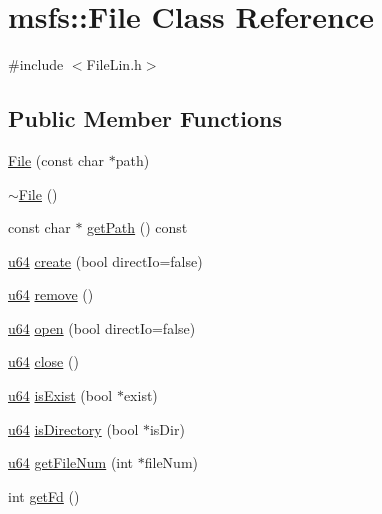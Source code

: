 \hypertarget{classmsfs_1_1_file}{}\section{msfs\+:\+:File Class Reference}
\label{classmsfs_1_1_file}


{\ttfamily \#include $<$File\+Lin.\+h$>$}

\subsection*{Public Member Functions}
\begin{DoxyCompactItemize}
\item 
\hyperlink{classmsfs_1_1_file_afffb980a173dcc744f5151afdf0d71aa}{File} (const char $\ast$path)
\item 
\hyperlink{classmsfs_1_1_file_acddda26533e9392df924d0f4f489c327}{$\sim$\+File} ()
\item 
const char $\ast$ \hyperlink{classmsfs_1_1_file_acb9bbd56964efe9021282b222fc18f97}{get\+Path} () const 
\item 
\hyperlink{_portable_8h_ad758b7a5c3f18ed79d2fcd23d9f16357}{u64} \hyperlink{classmsfs_1_1_file_a0b0462f18ef67e6738aeda1f6b1793be}{create} (bool direct\+Io=false)
\item 
\hyperlink{_portable_8h_ad758b7a5c3f18ed79d2fcd23d9f16357}{u64} \hyperlink{classmsfs_1_1_file_a383f3a7dc8eeb48e3378264908b87ece}{remove} ()
\item 
\hyperlink{_portable_8h_ad758b7a5c3f18ed79d2fcd23d9f16357}{u64} \hyperlink{classmsfs_1_1_file_a80b87f839f68f9b1d8870a62fded4ce5}{open} (bool direct\+Io=false)
\item 
\hyperlink{_portable_8h_ad758b7a5c3f18ed79d2fcd23d9f16357}{u64} \hyperlink{classmsfs_1_1_file_a38348346cf2c0e6ab0dab8a650a19794}{close} ()
\item 
\hyperlink{_portable_8h_ad758b7a5c3f18ed79d2fcd23d9f16357}{u64} \hyperlink{classmsfs_1_1_file_a3462d7f77e46c39059429807865144ac}{is\+Exist} (bool $\ast$exist)
\item 
\hyperlink{_portable_8h_ad758b7a5c3f18ed79d2fcd23d9f16357}{u64} \hyperlink{classmsfs_1_1_file_a101e031c6abb1bb635eeb2ee9e78463f}{is\+Directory} (bool $\ast$is\+Dir)
\item 
\hyperlink{_portable_8h_ad758b7a5c3f18ed79d2fcd23d9f16357}{u64} \hyperlink{classmsfs_1_1_file_ab4126e9757b13596366a091696346a3c}{get\+File\+Num} (int $\ast$file\+Num)
\item 
int \hyperlink{classmsfs_1_1_file_ad4977f128c4e251f9f45a0fd435c93d0}{get\+Fd} ()

\end{DoxyCompactItemize}
